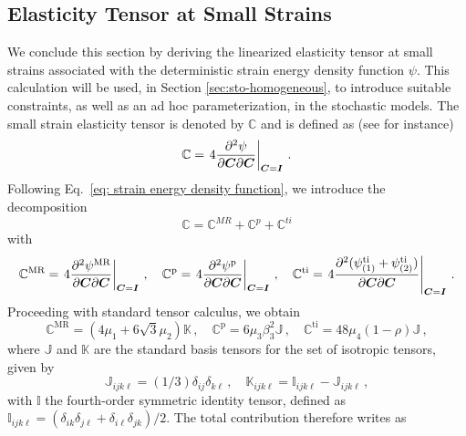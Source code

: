 \subsection{Elasticity Tensor at Small Strains} \label{Linearization}
We conclude this section by deriving the linearized elasticity tensor at small strains associated with the deterministic strain energy density function $\psi$. This calculation will be used, in Section \ref{sec:sto-homogeneous}, to introduce suitable constraints, as well as an ad hoc parameterization, in the stochastic models. The small strain elasticity tensor is denoted by $\mathbb{C}$ and is defined as (see \cite{Holzapfel-Book-2000} for instance)
\begin{equation}
    \mathbb{C} = \left.4\frac{\partial^2 \psi}{\partial \boldsymbol{C} \partial \boldsymbol{C}}\right\vert_{\boldsymbol{C} = \boldsymbol{I}}\,. \label{eq:elasticity-def}
\end{equation}
Following Eq.~\ref{eq: strain energy density function}, we introduce the decomposition
\begin{equation}
    \mathbb{C} = \mathbb{C}^{MR} + \mathbb{C}^{p} + \mathbb{C}^{ti}
\end{equation}
with
\begin{equation}
    \mathbb{C}^{\text{MR}} = \left.4\frac{\partial^2 \psi^{\text{MR}}}{\partial \boldsymbol{C} \partial \boldsymbol{C}}\right\vert_{\boldsymbol{C} = \boldsymbol{I}}\,, \quad
    \mathbb{C}^{\text{p}} = \left.4\frac{\partial^2 \psi^{\text{p}}}{\partial \boldsymbol{C} \partial \boldsymbol{C}}\right\vert_{\boldsymbol{C} = \boldsymbol{I}}\,, \quad
    \mathbb{C}^{\text{ti}} = \left.4\frac{\partial^2(\psi_{(1)}^{\text{ti}} + \psi_{(2)}^{\text{ti}})}{\partial \boldsymbol{C} \partial \boldsymbol{C}}\right\vert_{\boldsymbol{C} = \boldsymbol{I}}\,.
\end{equation}
Proceeding with standard tensor calculus, we obtain
\begin{equation}
    \mathbb{C}^{\text{MR}} = (4 \mu_1 + 6 \sqrt{3} \mu_2) \mathbb{K}\,, \quad \mathbb{C}^{\text{p}} = 6 \mu_3 \beta_3^2 \mathbb{J}\,, \quad \mathbb{C}^{\text{ti}} = 48 \mu_4(1-\rho)\mathbb{J}\,,
\end{equation}
where $\mathbb{J}$ and $\mathbb{K}$ are the standard basis tensors for the set of isotropic tensors, given by
\begin{equation}
    \mathbb{J}_{ijk\ell} = (1/3) \delta_{ij} \delta_{k\ell}\,, \quad \mathbb{K}_{ijk\ell} = \mathbb{I}_{ijk\ell} - \mathbb{J}_{ijk\ell}\,,
\end{equation}
with $\mathbb{I}$ the fourth-order symmetric identity tensor, defined as $\mathbb{I}_{ijk\ell} = (\delta_{ik}\delta_{j\ell}+\delta_{i\ell}\delta_{jk})/2$. The total contribution therefore writes as
